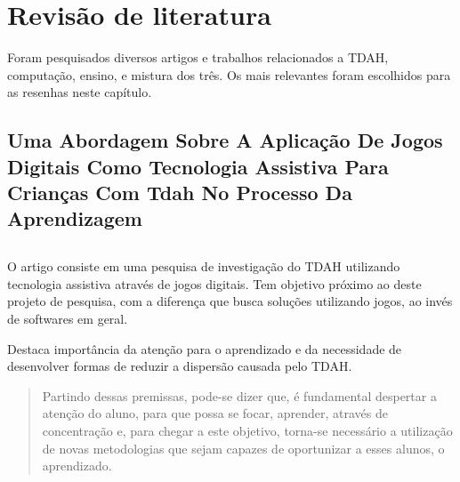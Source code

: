 
\chapter{Revisão de literatura}

Foram pesquisados diversos artigos e trabalhos relacionados a TDAH, computação, ensino, e mistura dos três. Os mais relevantes foram escolhidos para as resenhas neste capítulo.

\section{Uma Abordagem Sobre A Aplicação De Jogos Digitais Como Tecnologia Assistiva Para Crianças Com Tdah No 
Processo Da Aprendizagem}
\section*{\cite{claudia}}

O artigo consiste em uma pesquisa de investigação do TDAH utilizando tecnologia assistiva através de jogos digitais. Tem objetivo próximo ao deste projeto de pesquisa, com a diferença que busca soluções utilizando jogos, ao invés de softwares em geral.

Destaca importância da atenção para o aprendizado e da necessidade de desenvolver formas de reduzir a dispersão causada pelo TDAH.

\begin{quote}
Partindo dessas premissas, pode-se dizer que, é fundamental despertar a atenção do aluno, para que possa se focar, aprender, através de concentração e, para chegar a este objetivo, torna-se necessário a utilização de novas metodologias que sejam capazes de oportunizar a esses alunos, o aprendizado. \cite{claudia}
\end{quote}
    